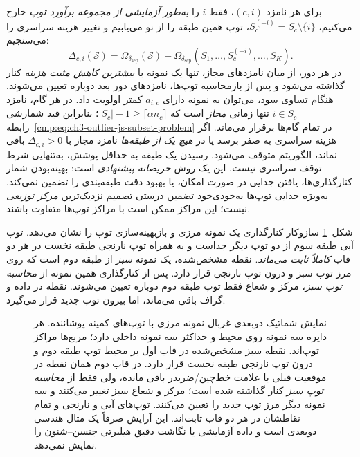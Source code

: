 برای هر نامزد $(c,i)$،
فقط $i$ را \emph{به‌طور آزمایشی
از مجموعه برآورد توپ} خارج می‌کنیم،
$S_c^{(-i)}=S_c\setminus\{i\}$،
توپ همین طبقه را از نو می‌یابیم
و تغییر هزینه سراسری را می‌سنجیم:
\begin{equation}\label{cmp:eq:ch3-outlier-js-greedy-gain}
\boxed{
\Delta_{c,i}(\mathscr S)=
\Omega_{\delta_{\mathrm{sep}}}(\mathscr S)
-\Omega_{\delta_{\mathrm{sep}}}
(S_1,\ldots,S_c^{(-i)},\ldots,S_K).
}
\end{equation}
در هر دور، از میان نامزدهای
مجاز، تنها یک نمونه با
\emph{بیشترین کاهش مثبت هزینه}
کنار گذاشته می‌شود و پس از
بازمحاسبه توپ‌ها، نامزدهای
دور بعد دوباره تعیین می‌شوند.
هنگام تساوی سود، می‌توان
به نمونه دارای $a_{i,c}$
کمتر اولویت داد. در هر گام، نامزد
$i\in S_c$ تنها زمانی
\emph{مجاز} است که
$|S_c|-1\ge
\lceil\alpha n_c\rceil$؛
بنابراین قید شمارشی
رابطه~\eqref{cmp:eq:ch3-outlier-js-subset-problem}
در تمام گام‌ها برقرار
می‌ماند. اگر هزینه سراسری
به صفر برسد یا در \emph{هیچ
یک از طبقه‌ها} نامزد مجاز
با $\Delta_{c,i}>0$ باقی
نماند، الگوریتم متوقف می‌شود.
رسیدن یک طبقه به حداقل
پوشش، به‌تنهایی شرط توقف
سراسری نیست.
این یک روش \emph{حریصانه پیشنهادی}
است: بهینه‌بودن شمار کنارگذاری‌ها،
یافتن جدایی در صورت امکان، یا
بهبود دقت طبقه‌بندی را تضمین
نمی‌کند. به‌ویژه جدایی توپ‌ها
به‌خودی‌خود تضمین درستی تصمیم
نزدیک‌ترین \emph{مرکز توزیعی}
نیست؛ این مراکز ممکن است با
مراکز توپ‌ها متفاوت باشند.

شکل~\ref{cmp:fig:ch3-js-overlap-boundary-screening}
سازوکار کنارگذاری یک نمونه مرزی
و بازبهینه‌سازی توپ را نشان می‌دهد.
توپ آبی طبقه سوم از دو توپ دیگر
جداست و به همراه توپ نارنجی طبقه نخست
در هر دو قاب \emph{کاملاً ثابت می‌ماند}.
نقطه مشخص‌شده، یک نمونه \emph{سبز}
از طبقه دوم است که روی مرز توپ سبز
و درون توپ نارنجی قرار دارد.
پس از کنارگذاری همین نمونه از
\emph{محاسبه توپ سبز}، مرکز و شعاع
فقط توپ طبقه دوم دوباره تعیین می‌شوند.
نقطه در داده و گراف باقی می‌ماند،
اما بیرون توپ جدید قرار می‌گیرد.

\begin{figure}[htbp]
\centering
\resizebox{0.98\linewidth}{!}{%
%
}
\caption{نمایش شماتیک دوبعدی غربال نمونه مرزی با توپ‌های کمینه پوشاننده. هر دایره سه نمونه روی محیط و حداکثر سه نمونه داخلی دارد؛ مربع‌ها مراکز توپ‌اند. نقطه سبز مشخص‌شده در قاب اول بر محیط توپ طبقه دوم و درون توپ نارنجی طبقه نخست قرار دارد. در قاب دوم همان نقطه در موقعیت قبلی با علامت خط‌چین/ضربدر باقی مانده، ولی فقط از \emph{محاسبه توپ سبز} کنار گذاشته شده است؛ مرکز و شعاع سبز تغییر می‌کنند و سه نمونه دیگر مرز توپ جدید را تعیین می‌کنند. توپ‌های آبی و نارنجی و تمام نقاطشان در هر دو قاب ثابت‌اند. این آرایش صرفاً یک مثال هندسی دوبعدی است و داده آزمایشی یا نگاشت دقیق هیلبرتی جنسن--شنون را نمایش نمی‌دهد.}
\label{cmp:fig:ch3-js-overlap-boundary-screening}
\end{figure}

